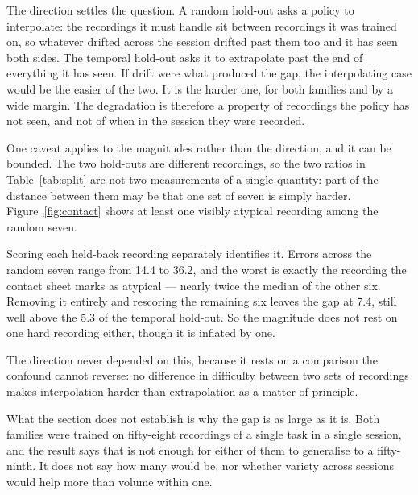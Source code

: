 The direction settles the question. A random hold-out asks a policy to
interpolate: the recordings it must handle sit between recordings it was trained
on, so whatever drifted across the session drifted past them too and it has seen
both sides. The temporal hold-out asks it to extrapolate past the end of
everything it has seen. If drift were what produced the gap, the interpolating
case would be the easier of the two. It is the harder one, for both families and
by a wide margin. The degradation is therefore a property of recordings the
policy has not seen, and not of when in the session they were recorded.

One caveat applies to the magnitudes rather than the direction, and it can be
bounded. The two hold-outs are different recordings, so the two ratios in
Table~\ref{tab:split} are not two measurements of a single quantity: part of the
distance between them may be that one set of seven is simply harder.
Figure~\ref{fig:contact} shows at least one visibly atypical recording among the
random seven.

Scoring each held-back recording separately identifies it. Errors across the
random seven range from \num{14.4} to \num{36.2}, and the worst is exactly the
recording the contact sheet marks as atypical --- nearly twice the median of the
other six. Removing it entirely and rescoring the remaining six leaves the gap
at \num{7.4}, still well above the \num{5.3} of the temporal hold-out. So the
magnitude does not rest on one hard recording either, though it is inflated by
one.

The direction never depended on this, because it rests on a comparison the
confound cannot reverse: no difference in difficulty between two sets of
recordings makes interpolation harder than extrapolation as a matter of
principle.

What the section does not establish is why the gap is as large as it is. Both
families were trained on fifty-eight recordings of a single task in a single
session, and the result says that is not enough for either of them to generalise
to a fifty-ninth. It does not say how many would be, nor whether variety across
sessions would help more than volume within one.
